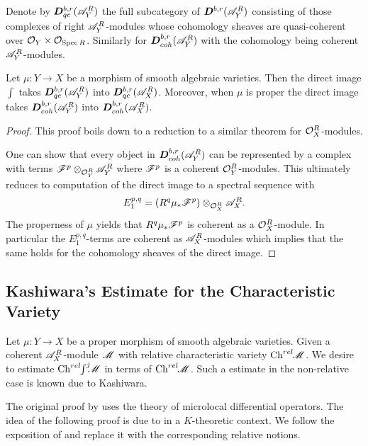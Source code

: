     Denote by $\boldsymbol{D}^{b,r}_{qc}(\mathscr{A}_Y^{R})$ the full subcategory of $\boldsymbol{D}^{b,r}(\mathscr{A}_Y^R)$ consisting of those complexes of right $\mathscr{A}_Y^R$-modules whose cohomology sheaves are quasi-coherent over $\mathcal{O}_Y\times \mathcal{O}_{\operatorname{Spec} R}$. Similarly for $\boldsymbol{D}^{b,r}_{coh}(\mathscr{A}_Y^R)$ with the cohomology being coherent $\mathscr{A}_Y^R$-modules.
    \begin{theorem}\label{thm: ConservationQuasiCoherentAndCoherentIfProper}
        Let $\mu:Y\to X$ be a morphism of smooth algebraic varieties. Then the direct image $\int$ takes $\boldsymbol{D}^{b,r}_{qc}(\mathscr{A}_Y^{R})$ into $\boldsymbol{D}^{b,r}_{qc}(\mathscr{A}_X^{R})$. Moreover, when $\mu$ is proper the direct image takes $\boldsymbol{D}^{b,r}_{coh}(\mathscr{A}_Y^R)$ into $\boldsymbol{D}^{b,r}_{coh}(\mathscr{A}_X^R)$.
    \end{theorem}
    \begin{proof}
      This proof boils down to a reduction to a similar theorem for $\mathcal{O}_X^R$-modules.

      One can show that every object in $\boldsymbol{D}^{b,r}_{coh}(\mathscr{A}_Y^R)$
      can be represented by a complex with terms $\mathscr{F}^p \otimes_{\mathcal{O}_Y^R} \mathscr{A}_Y^R$ where $\mathscr{F}^p$ is a coherent $\mathcal{O}_Y^R$-modules.
      This ultimately reduces to computation of the direct image to a spectral sequence with
      $$E_1^{p,q} = (R^q \mu_* \mathscr{F}^p) \otimes_{\mathcal{O}_X^R} \mathscr{A}_X^R.$$
      The properness of $\mu$ yields that $R^q \mu_* \mathscr{F}^p$ is coherent as a $\mathcal{O}_X^R$-module.
      In particular the $E_1^{p,q}$-terms are coherent as $\mathscr{A}_X^R$-modules which implies that the same holds for the cohomology sheaves of the direct image.
    \end{proof}
\subsection{Kashiwara's Estimate for the Characteristic Variety}
Let $\mu:Y\to X$ be a proper morphism of smooth algebraic varieties. Given a coherent $\mathscr{A}_X^R$-module $\mathscr{M}$ with relative characteristic variety $\operatorname{Ch}^{rel}\mkern-5mu \mathscr{M}$. We desire to estimate $\operatorname{Ch}^{rel}\mkern-5mu \int^j \mkern -8mu \mathscr{M}$ in terms of $\operatorname{Ch}^{rel}\mkern-5mu\mathscr{M}$. Such a estimate in the non-relative case is known due to Kashiwara. %

The original proof by \cite{kashiwara1976b} uses the theory of microlocal differential operators. The idea of the following proof is due to \cite{malgrange1985images} in a $K$-theoretic context. We follow the exposition of \cite{sabbah2011introduction} and replace it with the corresponding relative notions. %
\\

